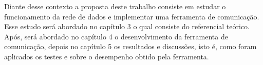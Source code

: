 	Diante desse contexto a proposta deste trabalho consiste em estudar o funcionamento da rede de dados e implementar uma ferramenta de comunicação. Esse estudo será abordado no capítulo 3 o qual consiste do referencial teórico.  Após, será abordado no capítulo 4 o desenvolvimento da ferramenta de comunicação, depois no capítulo 5 os resultados e discussões, isto é, como foram aplicados os testes e sobre o desempenho obtido pela ferramenta.